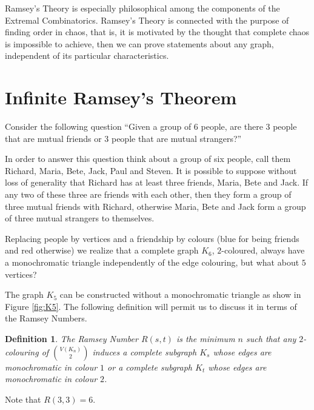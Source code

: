 \documentclass[12pt,twoside,a4paper,bibliography=totocnumbered]{book}
\numberwithin{equation}{section}
\newtheorem{definition}	[theorem] {Definition}
\theoremstyle{remark}
\begin{document}
Ramsey's Theory is especially philosophical among the components of the Extremal Combinatorics. Ramsey's Theory is connected with the purpose of finding order in chaos, that is, it is motivated by the thought that complete chaos is impossible to achieve, then we can prove statements about any graph, independent of its particular characteristics.

\section{Infinite Ramsey's Theorem}
Consider the following question ``Given a group of 6 people, are there 3 people that are mutual friends or 3 people that are mutual strangers?''

In order to answer this question think about a group of six people, call them Richard, Maria, Bete, Jack, Paul and Steven. It is possible to suppose without loss of generality that Richard has at least three friends, Maria, Bete and Jack. If any two of these three are friends with each other, then they form a group of three mutual friends with Richard, otherwise Maria, Bete and Jack form a group of three mutual strangers to themselves. 

Replacing people by vertices and a friendship by colours (blue for being friends and red otherwise) we realize that a complete graph $K_6$, $2$-coloured, always have a monochromatic triangle independently of the edge colouring, but what about $5$ vertices?

The graph $K_5$ can be constructed without a monochromatic triangle as show in Figure \ref{fig:K5}. The following definition will permit us to discuss it in terms of the Ramsey Numbers.

\begin{definition}\label{def:RamseyNumbers} 
The \emph{Ramsey Number} $R(s,t)$ is the minimum $n$ such that any $2$-colouring of $\binom{V(K_n)}{2}$ induces a complete subgraph $K_s$ whose edges are monochromatic in colour $1$ or a complete subgraph $K_t$ whose edges are monochromatic in colour $2$.
\end{definition}

Note that $R(3,3) = 6$.
\end{document}
